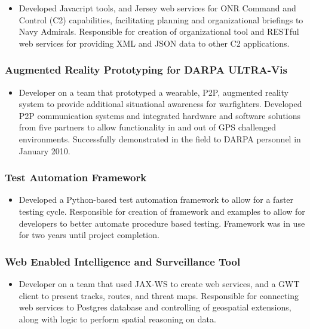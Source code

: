 \documentclass[11pt]{article}
\begin{document}
\begin{itemize}
\item Developed Javacript tools, and Jersey web services for ONR Command and Control (C2) capabilities, facilitating planning and organizational briefings to Navy Admirals. Responsible for creation of organizational tool and RESTful web services for providing XML and JSON data to other C2 applications.
\end{itemize}
\subsubsection*{Augmented Reality Prototyping for DARPA ULTRA-Vis}
\label{sec-1.1.4}

\begin{itemize}
\item Developer on a team that prototyped a wearable, P2P, augmented reality system to provide additional situational awareness for warfighters. Developed P2P communication systems and integrated hardware and software solutions from five partners to allow functionality in and out of GPS challenged environments. Successfully demonstrated in the field to DARPA personnel in January 2010.
\end{itemize}
\subsubsection*{Test Automation Framework}
\label{sec-1.1.5}

\begin{itemize}
\item Developed a Python-based test automation framework to allow for a faster testing cycle. Responsible for creation of framework and examples to allow for developers to better automate procedure based testing. Framework was in use for two years until project completion.
\end{itemize}
\subsubsection*{Web Enabled Intelligence and Surveillance Tool}
\label{sec-1.1.6}

\begin{itemize}
\item Developer on a team that used JAX-WS to create web services, and a GWT client to present tracks, routes, and threat maps. Responsible for connecting web services to Postgres database and controlling of geospatial extensions, along with logic to perform spatial reasoning on data.
\end{itemize}
\end{document}
